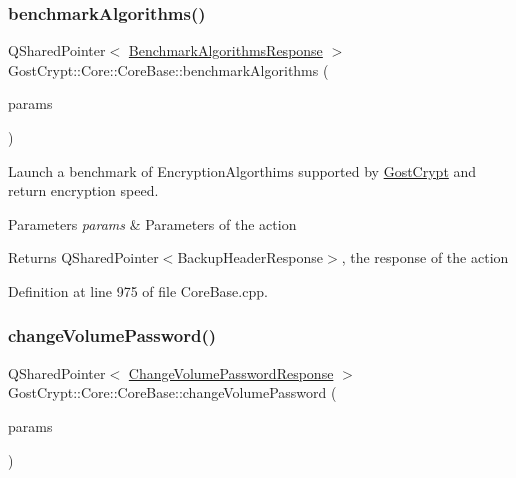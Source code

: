 \subsubsection{\texorpdfstring{benchmark\+Algorithms()}{benchmarkAlgorithms()}}
{\footnotesize\ttfamily Q\+Shared\+Pointer$<$ \hyperlink{struct_gost_crypt_1_1_core_1_1_benchmark_algorithms_response}{Benchmark\+Algorithms\+Response} $>$ Gost\+Crypt\+::\+Core\+::\+Core\+Base\+::benchmark\+Algorithms (\begin{DoxyParamCaption}\item[{Q\+Shared\+Pointer$<$ \hyperlink{struct_gost_crypt_1_1_core_1_1_benchmark_algorithms_request}{Benchmark\+Algorithms\+Request} $>$}]{params }\end{DoxyParamCaption})\hspace{0.3cm}{\ttfamily [protected]}}



Launch a benchmark of Encryption\+Algorthims supported by \hyperlink{namespace_gost_crypt}{Gost\+Crypt} and return encryption speed. 


\begin{DoxyParams}{Parameters}
{\em params} & Parameters of the action \\
\hline
\end{DoxyParams}
\begin{DoxyReturn}{Returns}
Q\+Shared\+Pointer$<$\+Backup\+Header\+Response$>$, the response of the action 
\end{DoxyReturn}


Definition at line 975 of file Core\+Base.\+cpp.

\mbox{\label{class_gost_crypt_1_1_core_1_1_core_base_a8add14f79b2676e0015ee00a7ea4c96a}} 
\subsubsection{\texorpdfstring{change\+Volume\+Password()}{changeVolumePassword()}}
{\footnotesize\ttfamily Q\+Shared\+Pointer$<$ \hyperlink{struct_gost_crypt_1_1_core_1_1_change_volume_password_response}{Change\+Volume\+Password\+Response} $>$ Gost\+Crypt\+::\+Core\+::\+Core\+Base\+::change\+Volume\+Password (\begin{DoxyParamCaption}\item[{Q\+Shared\+Pointer$<$ \hyperlink{struct_gost_crypt_1_1_core_1_1_change_volume_password_request}{Change\+Volume\+Password\+Request} $>$}]{params }\end{DoxyParamCaption})\hspace{0.3cm}{\ttfamily [protected]}}



